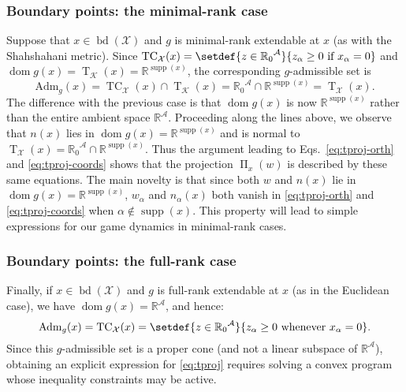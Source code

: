 \documentclass[reqno]{amsart}
\theoremstyle{plain}
\theoremstyle{definition}
\theoremstyle{remark}
\numberwithin{equation}{section}
\numberwithin{theorem}{section}
\begin{document}
\subsubsection*{Boundary points: the minimal-rank case}
Suppose that $x \in \operatorname{bd}({\mathcal{X}})$ and $g$ is minimal-rank extendable at $x$ (as with the Shahshahani metric).
Since $\operatorname{TC}_{\mathcal{X}}(x) = \setdef{z\in{{\mathbb{R}}_{0}}^{\mathcal{A}}}{z_\alpha \geq 0 \text{ if } x_{\alpha} = 0}$ and ${\operatorname{dom} g}(x) = \operatorname{T}_{\mathcal{K}}(x) = {\mathbb{R}}^{\operatorname{supp}(x)}$, the corresponding $g$-admissible set is
\begin{equation}
\label{eq:ProjDomBdMin}
{\textrm{Adm}_{g}}(x)
	= \operatorname{TC}_{\mathcal{X}}(x) \cap \operatorname{T}_{\mathcal{K}}(x)
	 = {{\mathbb{R}}_{0}}^{\mathcal{A}} \cap {\mathbb{R}}^{\operatorname{supp}(x)}= \operatorname{T}_{\mathcal{X}}(x).
	
\end{equation}
The difference with the previous case is that ${\operatorname{dom} g}(x)$ is now ${\mathbb{R}}^{\operatorname{supp}(x)}$ rather than the entire ambient space ${\mathbb{R}}^{\mathcal{A}}$.
Proceeding along the lines above, we observe that ${n}(x)$ lies in ${\operatorname{dom} g}(x)={\mathbb{R}}^{\operatorname{supp}(x)}$ and is normal to $\operatorname{T}_{\mathcal{X}}(x)={{\mathbb{R}}_{0}}^{\mathcal{A}} \cap {\mathbb{R}}^{\operatorname{supp}(x)}$.  
Thus the argument leading to Eqs.~\eqref{eq:tproj-orth} and \eqref{eq:tproj-coords} shows that the projection $\operatorname{\Pi}_{x}(w)$ is described by these same equations.
The main novelty is that since both $w$ and ${n}(x)$ lie in ${\operatorname{dom} g}(x) = {\mathbb{R}}^{\operatorname{supp}(x)}$,   $w_{\alpha}$ and ${n}_{\alpha}(x)$ both vanish in \eqref{eq:tproj-orth} and \eqref{eq:tproj-coords}
when $\alpha\notin\operatorname{supp}(x)$.
This property will lead to simple expressions for our game dynamics in minimal-rank cases.

\subsubsection*{Boundary points: the full-rank case}
Finally, if $x \in \operatorname{bd}({\mathcal{X}})$ and $g$ is full-rank extendable at $x$ (as in the Euclidean case), we have ${\operatorname{dom} g}(x) = {\mathbb{R}}^{\mathcal{A}}$, and hence:
\begin{equation}
\label{eq:ProjDomBdMax}
{\textrm{Adm}_{g}}(x)
	= \operatorname{TC}_{\mathcal{X}}(x) = \setdef{z\in{{\mathbb{R}}_{0}}^{\mathcal{A}}}{z_\alpha \geq 0 \text{ whenever } x_{\alpha} = 0}.
\end{equation}
Since this $g$-admissible set is a proper cone (and not a linear subspace of ${\mathbb{R}}^{\mathcal{A}}$), obtaining an explicit expression for \eqref{eq:tproj} requires solving a convex program whose inequality constraints may be active.
\end{document}
